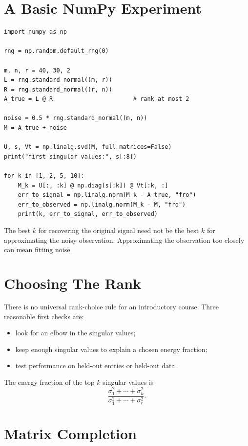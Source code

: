 \section{A Basic NumPy Experiment}

\begin{lstlisting}
import numpy as np

rng = np.random.default_rng(0)

m, n, r = 40, 30, 2
L = rng.standard_normal((m, r))
R = rng.standard_normal((r, n))
A_true = L @ R                       # rank at most 2

noise = 0.5 * rng.standard_normal((m, n))
M = A_true + noise

U, s, Vt = np.linalg.svd(M, full_matrices=False)
print("first singular values:", s[:8])

for k in [1, 2, 5, 10]:
    M_k = U[:, :k] @ np.diag(s[:k]) @ Vt[:k, :]
    err_to_signal = np.linalg.norm(M_k - A_true, "fro")
    err_to_observed = np.linalg.norm(M_k - M, "fro")
    print(k, err_to_signal, err_to_observed)
\end{lstlisting}

The best $k$ for recovering the original signal need not be the best $k$ for
approximating the noisy observation. Approximating the observation too closely
can mean fitting noise.

\section{Choosing The Rank}

There is no universal rank-choice rule for an introductory course. Three
reasonable first checks are:

\begin{itemize}
  \item look for an elbow in the singular values;
  \item keep enough singular values to explain a chosen energy fraction;
  \item test performance on held-out entries or held-out data.
\end{itemize}

The energy fraction of the top $k$ singular values is
\[
  \frac{\sigma_1^2+\cdots+\sigma_k^2}
       {\sigma_1^2+\cdots+\sigma_r^2}.
\]

\section{Matrix Completion}

